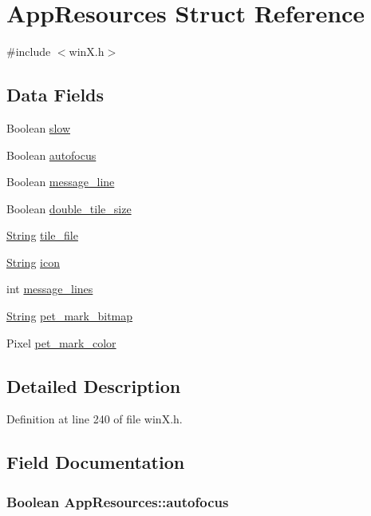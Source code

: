 \hypertarget{structAppResources}{\section{App\+Resources Struct Reference}
\label{structAppResources}
}


{\ttfamily \#include $<$win\+X.\+h$>$}

\subsection*{Data Fields}
\begin{DoxyCompactItemize}
\item 
Boolean \hyperlink{structAppResources_a1c7a8208dca6dbf4d9907629bc1e8f7f}{slow}
\item 
Boolean \hyperlink{structAppResources_acd1ad738ab69d0538dee41f849b3df00}{autofocus}
\item 
Boolean \hyperlink{structAppResources_ab51e05aca21e80dd076c0d2b763dd987}{message\+\_\+line}
\item 
Boolean \hyperlink{structAppResources_a21178d8005fbcf96d12f1c7a19299ebd}{double\+\_\+tile\+\_\+size}
\item 
\hyperlink{winreq_8c_a390a5f3d86203009670d84592ac44102}{String} \hyperlink{structAppResources_a7fb6f484113fc3cb8bc76fe9cc9fc05e}{tile\+\_\+file}
\item 
\hyperlink{winreq_8c_a390a5f3d86203009670d84592ac44102}{String} \hyperlink{structAppResources_acab87331fda96ed505cbd1d1fa1c7456}{icon}
\item 
int \hyperlink{structAppResources_acab8a58e15d8d2122aeba73f0861c22b}{message\+\_\+lines}
\item 
\hyperlink{winreq_8c_a390a5f3d86203009670d84592ac44102}{String} \hyperlink{structAppResources_a2d293512a3ea1acf1dc55a30ddd1dd9e}{pet\+\_\+mark\+\_\+bitmap}
\item 
Pixel \hyperlink{structAppResources_a0f401bd76787c747f2fb7b8553d834ce}{pet\+\_\+mark\+\_\+color}
\end{DoxyCompactItemize}


\subsection{Detailed Description}


Definition at line 240 of file win\+X.\+h.



\subsection{Field Documentation}
\hypertarget{structAppResources_acd1ad738ab69d0538dee41f849b3df00}{
\subsubsection[{autofocus}]{\setlength{\rightskip}{0pt plus 5cm}Boolean App\+Resources\+::autofocus}}\label{structAppResources_acd1ad738ab69d0538dee41f849b3df00}


